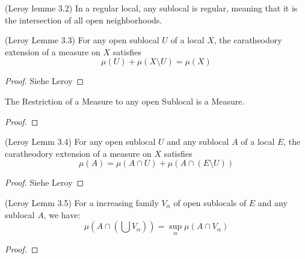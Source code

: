 \begin{lemma}
(Leroy lemme 3.2)
    \label{lem:regularity_of_sublocals}
    \leanok
    In a regular local, any sublocal is regular, meaning that it is the intersection of all open neighborhoods.
\end{lemma}


\begin{lemma}
(Leroy Lemme 3.3)
    \label{lem:measure_add_compl_eq_top}
    \leanok
    For any open sublocal $U$ of a local $X$, the caratheodory extension of a measure on $X$ satisfies \[\mu(U) + \mu(X \setminus U) = \mu(X)\]
\end{lemma}
\begin{proof}
    \leanok
    Siehe Leroy
\end{proof}



\begin{lemma}[Restriction]
    The Restriction of a Measure to any open Sublocal is a Measure.
    \label{lem:restriction}
    \leanok
\end{lemma}
\begin{proof}
\leanok
\end{proof}

\begin{lemma}[Property 2]
(Leroy Lemm 3.4)
    \label{lem:restrict_add_compl_eq_top}
    \leanok
    For any open sublocal $U$ and any sublocal $A$ of a local $E$, the caratheodory extension of a measure on $X$ satisfies \[\mu(A) = \mu(A \cap U) + \mu(A \cap(E\setminus U))\]
\end{lemma}
\begin{proof}
    Siehe Leroy
    \leanok
\end{proof}

\begin{lemma}[Property 3]
(Leroy Lemm 3.5)
    \label{lem:restrict_preserves_sSup}
    \leanok
    For a increasing family $V_{\alpha}$ of open sublocals of $E$ and any sublocal $A$, we have:
    \[\mu(A \cap(\bigcup V_{\alpha})) = \sup_\alpha \mu(A\cap V_\alpha)\]
\end{lemma}
\begin{proof}
    \leanok
\end{proof}

